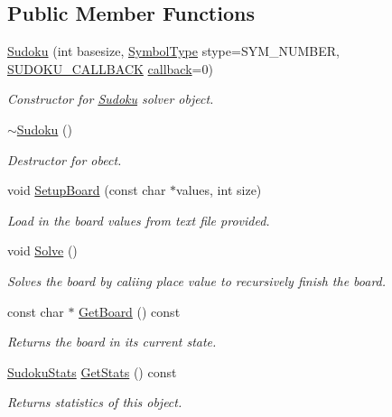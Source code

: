 \subsection*{Public Member Functions}
\begin{DoxyCompactItemize}
\item 
\hyperlink{classSudoku_a3e44afdd5799061b976bd643e3186ca4}{Sudoku} (int basesize, \hyperlink{classSudoku_ae58a74aa553563f6db22b82329631838}{Symbol\-Type} stype=S\-Y\-M\-\_\-\-N\-U\-M\-B\-E\-R, \hyperlink{classSudoku_ab9d5a4c123c93f3afb066e5f83149c57}{S\-U\-D\-O\-K\-U\-\_\-\-C\-A\-L\-L\-B\-A\-C\-K} \hyperlink{classSudoku_a276e4848efaf2ab0738752016059bd4d}{callback}=0)
\begin{DoxyCompactList}\small\item\em Constructor for \hyperlink{classSudoku}{Sudoku} solver object. \end{DoxyCompactList}\item 
\hypertarget{classSudoku_a9c949b824fa3d98d3515dbecb8cf413e}{\hyperlink{classSudoku_a9c949b824fa3d98d3515dbecb8cf413e}{$\sim$\-Sudoku} ()}\label{classSudoku_a9c949b824fa3d98d3515dbecb8cf413e}

\begin{DoxyCompactList}\small\item\em Destructor for obect. \end{DoxyCompactList}\item 
void \hyperlink{classSudoku_aeb8c521f92f73bbe277d2f6b2c40522b}{Setup\-Board} (const char $\ast$values, int size)
\begin{DoxyCompactList}\small\item\em Load in the board values from text file provided. \end{DoxyCompactList}\item 
\hypertarget{classSudoku_a0a46370670ce20e8d56a77b38abddc96}{void \hyperlink{classSudoku_a0a46370670ce20e8d56a77b38abddc96}{Solve} ()}\label{classSudoku_a0a46370670ce20e8d56a77b38abddc96}

\begin{DoxyCompactList}\small\item\em Solves the board by caliing place value to recursively finish the board. \end{DoxyCompactList}\item 
const char $\ast$ \hyperlink{classSudoku_a898d752757dfa7617ae7e44f839032aa}{Get\-Board} () const 
\begin{DoxyCompactList}\small\item\em Returns the board in its current state. \end{DoxyCompactList}\item 
\hyperlink{structSudoku_1_1SudokuStats}{Sudoku\-Stats} \hyperlink{classSudoku_ab4cb2465e3fdd17a87f815ee67def231}{Get\-Stats} () const 
\begin{DoxyCompactList}\small\item\em Returns statistics of this object. \end{DoxyCompactList}\end{DoxyCompactItemize}
